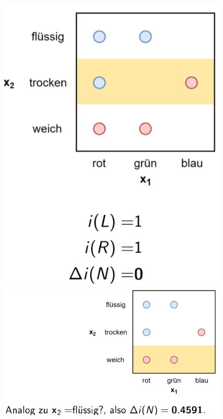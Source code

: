 \documentclass{report}
\begin{document}
\begin{figure}[H]
  \centering
  \begin{minipage}[b]{0.4\textwidth}
    \includegraphics[scale=.235]{ml07_12}
  \end{minipage}
  \begin{minipage}[b]{0.4\textwidth}
    \includegraphics[scale=.235]{ml07_13}
  \end{minipage}
\end{figure}
\end{document}
